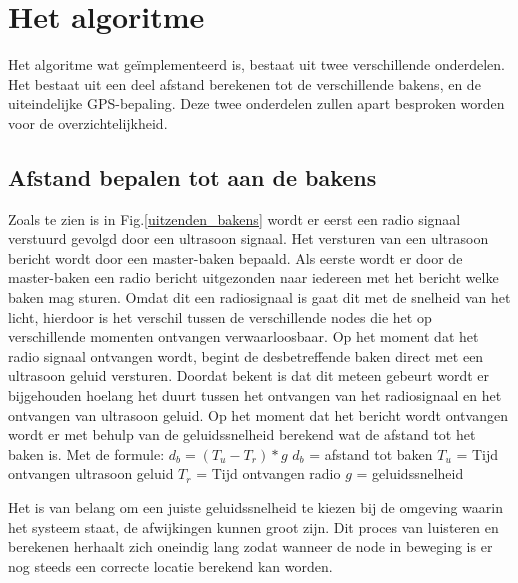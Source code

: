 \documentclass{article}
\begin{document}
\section{Het algoritme}
Het algoritme wat ge\"{i}mplementeerd is, bestaat uit twee verschillende onderdelen. Het bestaat uit een deel afstand berekenen tot de verschillende bakens, en de uiteindelijke GPS-bepaling. 
Deze twee onderdelen zullen apart besproken worden voor de overzichtelijkheid.
	
\subsection{Afstand bepalen tot aan de bakens}
	Zoals te zien is in Fig.\ref{uitzenden_bakens} wordt er eerst een radio signaal verstuurd gevolgd door een ultrasoon signaal. Het versturen van een ultrasoon bericht wordt door een master-baken bepaald. Als eerste wordt er door de master-baken een radio bericht uitgezonden naar iedereen met het bericht welke baken mag sturen. Omdat dit een radiosignaal is gaat dit met de snelheid van het licht, hierdoor is het verschil tussen de verschillende nodes die het op verschillende momenten ontvangen verwaarloosbaar. Op het moment dat het radio signaal ontvangen wordt, begint de desbetreffende baken direct met een ultrasoon geluid versturen. Doordat bekent is dat dit meteen gebeurt wordt er bijgehouden hoelang het duurt tussen het ontvangen van het radiosignaal en het ontvangen van ultrasoon geluid. Op het moment dat het bericht wordt ontvangen wordt er met behulp van de geluidssnelheid berekend wat de afstand tot het baken is. Met de formule:\newline
	$ d_b = (T_u- T_r) * g $
	\newline\newline
	$ d_b$ = afstand tot baken\newline
	$T_u$ = Tijd ontvangen ultrasoon geluid\newline
	$T_r$ = Tijd ontvangen radio\newline
	$g$ = geluidssnelheid\newline
	
	Het is van belang om een juiste geluidssnelheid te kiezen bij de omgeving waarin het systeem staat, de afwijkingen kunnen groot zijn. Dit proces van luisteren en berekenen herhaalt zich oneindig lang zodat wanneer de node in beweging is er nog steeds een correcte locatie berekend kan worden. 
	
\end{document}

